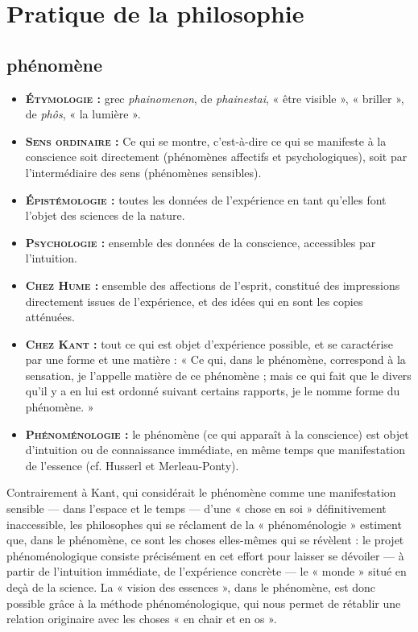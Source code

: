 \section{Pratique de la philosophie}

\subsection{phénomène}

\begin{itemize}[leftmargin=1cm, label=, itemsep=1pt]
\item {\bf \textsc{Étymologie} :} grec {\it phainomenon},
de {\it phainestai}, « être visible »,
« briller », de {\it phôs}, « la lumière ».
\item {\bf \textsc{Sens ordinaire} :} Ce qui se
montre, c’est-à-dire ce qui se manifeste
à la conscience soit directement
(phénomènes affectifs et
psychologiques), soit par l’intermédiaire
des sens (phénomènes sensibles).
\item {\bf \textsc{Épistémologie} :} toutes les
données de l'expérience en tant
qu’elles font l’objet des sciences de
la nature.
\item {\bf \textsc{Psychologie} :} ensemble des données de la
conscience, accessibles par l’intuition.
\item {\bf \textsc{Chez Hume} :} ensemble des
affections de l'esprit, constitué des
impressions directement issues de
l'expérience, et des idées qui en
sont les copies atténuées.
\item {\bf \textsc{Chez Kant} :} tout ce qui est objet d’expérience
possible, et se caractérise par
une forme et une matière : « Ce qui,
dans le phénomène, correspond à
la sensation, je l'appelle matière de
ce phénomène ; mais ce qui fait que
le divers qu'il y a en lui est ordonné
suivant certains rapports, je le
nomme forme du phénomène. »
\item {\bf \textsc{Phénoménologie} :} le  phénomène
(ce qui apparaît à la
conscience) est objet d’intuition ou
de connaissance immédiate, en
même temps que manifestation de
l'essence (cf. Husserl et Merleau-Ponty).
\end{itemize}

Contrairement à Kant, qui considérait le
phénomène comme une manifestation
sensible — dans l’espace et le temps —
d’une « chose en soi » définitivement inaccessible,
les philosophes qui se réclament
de la « phénoménologie » estiment que,
dans le phénomène, ce sont les choses
elles-mêmes qui se révèlent : le projet
phénoménologique consiste précisément
en cet effort pour laisser se dévoiler — à
partir de l'intuition immédiate, de l'expérience
concrète — le « monde » situé en
deçà de la science. La « vision des
essences », dans le phénomène, est donc
possible grâce à la méthode phénoménologique,
qui nous permet de rétablir
une relation originaire avec les choses
« en chair et en os ».

